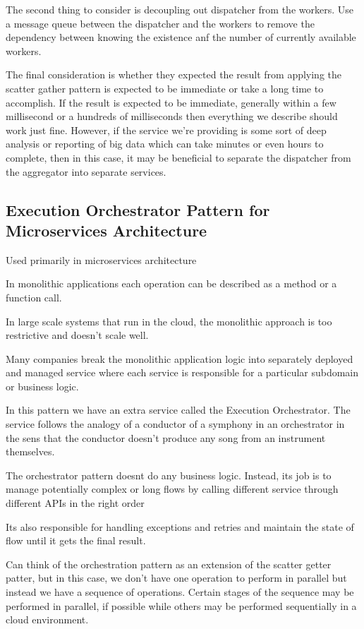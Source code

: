 The second thing to consider is decoupling out dispatcher from the workers.
Use a message queue between the dispatcher and the workers to remove the dependency between knowing the existence anf the number of currently available workers.

The final consideration is whether they expected the result from applying the scatter gather pattern is expected to be immediate or take a long time to accomplish.
If the result is expected to be immediate, generally within a few millisecond or a hundreds of milliseconds then everything we describe should work just fine.
However, if the service we're providing is some sort of deep analysis or reporting of big data which can take minutes or even hours to complete, then in this case, it may be beneficial to separate the dispatcher from the aggregator into separate services.

\subsection{Execution Orchestrator Pattern for Microservices Architecture}
Used primarily in microservices architecture

In monolithic applications each operation can be described as a method or a function call.

In large scale systems that run in the cloud, the monolithic approach is too restrictive and doesn't scale well.

Many companies break the monolithic application logic into separately deployed and managed service where each service is responsible for a particular subdomain or business logic.

In this pattern we have an extra service called the Execution Orchestrator.
The service follows the analogy of a conductor of a symphony in an orchestrator in the sens that the conductor doesn't produce any song from an instrument themselves.

The orchestrator pattern doesnt do any business logic.
Instead, its job is to manage potentially complex or long flows by calling different service through different APIs in the right order

Its also responsible for handling exceptions and retries and maintain the state of flow until it gets the final result.

Can think of the orchestration pattern as an extension of the scatter getter patter, but in this case, we don't have one operation to perform in parallel but instead we have a sequence of operations.
Certain stages of the sequence may be performed in parallel, if possible while others may be performed sequentially in a cloud environment.

